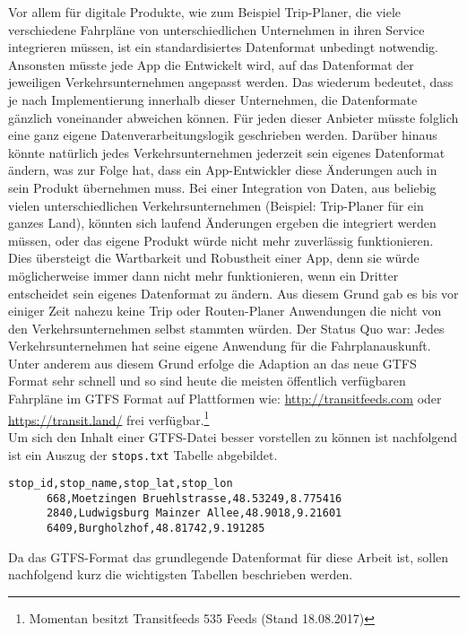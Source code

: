 \begin{newpage}
		Vor allem für digitale Produkte, wie zum Beispiel Trip-Planer, die viele verschiedene Fahrpläne von unterschiedlichen Unternehmen in ihren Service integrieren müssen, ist ein standardisiertes Datenformat unbedingt notwendig. 
		Ansonsten müsste jede App die Entwickelt wird, auf das Datenformat der jeweiligen Verkehrsunternehmen angepasst werden. Das wiederum bedeutet, dass je nach Implementierung innerhalb dieser Unternehmen, die Datenformate gänzlich voneinander abweichen können. Für jeden dieser Anbieter müsste folglich eine ganz eigene Datenverarbeitungslogik geschrieben werden.
    Darüber hinaus könnte natürlich jedes Verkehrsunternehmen jederzeit sein eigenes Datenformat ändern, was zur Folge hat, dass ein App-Entwickler diese Änderungen auch in sein Produkt übernehmen muss. Bei einer Integration von Daten, aus beliebig vielen unterschiedlichen Verkehrsunternehmen (Beispiel: Trip-Planer für ein ganzes Land), könnten sich laufend Änderungen ergeben die integriert werden müssen, oder das eigene Produkt würde nicht mehr zuverlässig funktionieren. Dies übersteigt die Wartbarkeit und Robustheit einer App, denn sie würde möglicherweise immer dann nicht mehr funktionieren, wenn ein Dritter entscheidet sein eigenes Datenformat zu ändern. Aus diesem Grund gab es bis vor einiger Zeit nahezu keine Trip oder Routen-Planer Anwendungen die nicht von den Verkehrsunternehmen selbst stammten würden. Der Status Quo war: Jedes Verkehrsunternehmen hat seine eigene Anwendung für die Fahrplanauskunft. Unter anderem aus diesem Grund erfolge die Adaption an das neue GTFS Format sehr schnell und so sind heute die meisten öffentlich verfügbaren Fahrpläne im GTFS Format auf Plattformen wie: \url{http://transitfeeds.com} oder \url{https://transit.land/} frei verfügbar.\footnote{Momentan besitzt Transitfeeds 535 Feeds (Stand 18.08.2017)}\\

    Um sich den Inhalt einer GTFS-Datei besser vorstellen zu können ist nachfolgend ist ein Auszug der \texttt{stops.txt} Tabelle abgebildet.

    \begin{lstlisting}[captionpos=b, caption=Auszug der ersten Zeilen von \texttt{stops.txt}, label=lst:gtfs-auszug]
      stop_id,stop_name,stop_lat,stop_lon
      668,Moetzingen Bruehlstrasse,48.53249,8.775416
      2840,Ludwigsburg Mainzer Allee,48.9018,9.21601
      6409,Burgholzhof,48.81742,9.191285
    \end{lstlisting}

		Da das GTFS-Format das grundlegende Datenformat für diese Arbeit ist, sollen nachfolgend kurz die wichtigsten Tabellen beschrieben werden.


\end{newpage}

